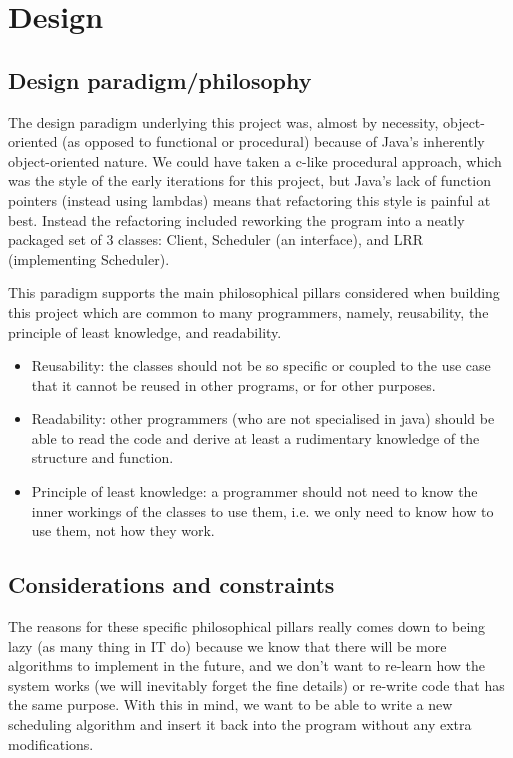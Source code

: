 \documentclass[a4paper]{article} %
\begin{document}
\section{Design}
\subsection{Design paradigm/philosophy}
The design paradigm underlying this project was, almost by necessity, object-oriented (as opposed to functional or procedural) because of Java’s inherently object-oriented nature. We could have taken a c-like procedural approach, which was the style of the early iterations for this project, but Java’s lack of function pointers (instead using lambdas) means that refactoring this style is painful at best. Instead the refactoring included reworking the program into a neatly packaged set of 3 classes: Client, Scheduler (an interface), and LRR (implementing Scheduler).\par
This paradigm supports the main philosophical pillars considered when building this project which are common to many programmers, namely, reusability, the principle of least knowledge, and readability. 
\begin{itemize}
    \item Reusability: the classes should not be so specific or coupled to the use case that it cannot be reused in other programs, or for other purposes.
    \item Readability: other programmers (who are not specialised in java) should be able to read the code and derive at least a rudimentary knowledge of the structure and function.
    \item Principle of least knowledge: a programmer should not need to know the inner workings of the classes to use them, i.e. we only need to know how to use them, not how they work. 
\end{itemize}

\subsection{Considerations and constraints}
The reasons for these specific philosophical pillars really comes down to being lazy (as many thing in IT do) because we know that there will be more algorithms to implement in the future, and we don’t want to re-learn how the system works (we will inevitably forget the fine details) or re-write code that has the same purpose. With this in mind, we want to be able to write a new scheduling algorithm and insert it back into the program without any extra modifications. 
\end{document}
